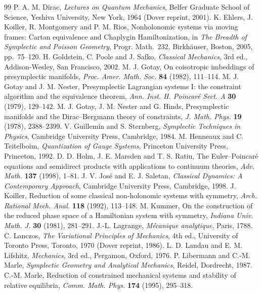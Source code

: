 \documentclass[11pt,a4paper]{article}
\numberwithin{equation}{section}
\theoremstyle{plain}
\theoremstyle{definition}
\theoremstyle{remark}
\begin{document}
\begin{thebibliography}{99}
 P. A. M. Dirac, \emph{Lectures on Quantum Mechanics}, Belfer Graduate School of Science, Yeshiva University, New York, 1964 (Dover reprint, 2001).
 K. Ehlers, J. Koiller, R. Montgomery and P. M. Rios, Nonholonomic systems via moving frames: Cartan equivalence and Chaplygin Hamiltonization, in \emph{The Breadth of Symplectic and Poisson Geometry}, Progr. Math.\ 232, Birkh\"auser, Boston, 2005, pp.~75--120.
 H. Goldstein, C. Poole and J. Safko, \emph{Classical Mechanics}, 3rd ed., Addison-Wesley, San Francisco, 2002.
 M. J. Gotay, On coisotropic imbeddings of presymplectic manifolds, \emph{Proc. Amer. Math. Soc.} \textbf{84} (1982), 111--114.
 M. J. Gotay and J. M. Nester, Presymplectic Lagrangian systems I: the constraint algorithm and the equivalence theorem, \emph{Ann. Inst. H. Poincar\'e Sect. A} \textbf{30} (1979), 129--142.
 M. J. Gotay, J. M. Nester and G. Hinds, Presymplectic manifolds and the Dirac--Bergmann theory of constraints, \emph{J. Math. Phys.} \textbf{19} (1978), 2388--2399.
 V. Guillemin and S. Sternberg, \emph{Symplectic Techniques in Physics}, Cambridge University Press, Cambridge, 1984.
 M. Henneaux and C. Teitelboim, \emph{Quantization of Gauge Systems}, Princeton University Press, Princeton, 1992.
 D. D. Holm, J. E. Marsden and T. S. Ratiu, The Euler--Poincar\'e equations and semidirect products with applications to continuum theories, \emph{Adv. Math.} \textbf{137} (1998), 1--81.
 J. V. Jos\'e and E. J. Saletan, \emph{Classical Dynamics: A Contemporary Approach}, Cambridge University Press, Cambridge, 1998.
 J. Koiller, Reduction of some classical non-holonomic systems with symmetry, \emph{Arch. Rational Mech. Anal.} \textbf{118} (1992), 113--148.
 M. Kummer, On the construction of the reduced phase space of a Hamiltonian system with symmetry, \emph{Indiana Univ. Math. J.} \textbf{30} (1981), 281--291.
 J.-L. Lagrange, \emph{M\'ecanique analytique}, Paris, 1788.
 C. Lanczos, \emph{The Variational Principles of Mechanics}, 4th ed., University of Toronto Press, Toronto, 1970 (Dover reprint, 1986).
 L. D. Landau and E. M. Lifshitz, \emph{Mechanics}, 3rd ed., Pergamon, Oxford, 1976.
 P. Libermann and C.-M. Marle, \emph{Symplectic Geometry and Analytical Mechanics}, Reidel, Dordrecht, 1987.
 C.-M. Marle, Reduction of constrained mechanical systems and stability of relative equilibria, \emph{Comm. Math. Phys.} \textbf{174} (1995), 295--318.

\end{thebibliography}
\end{document}
